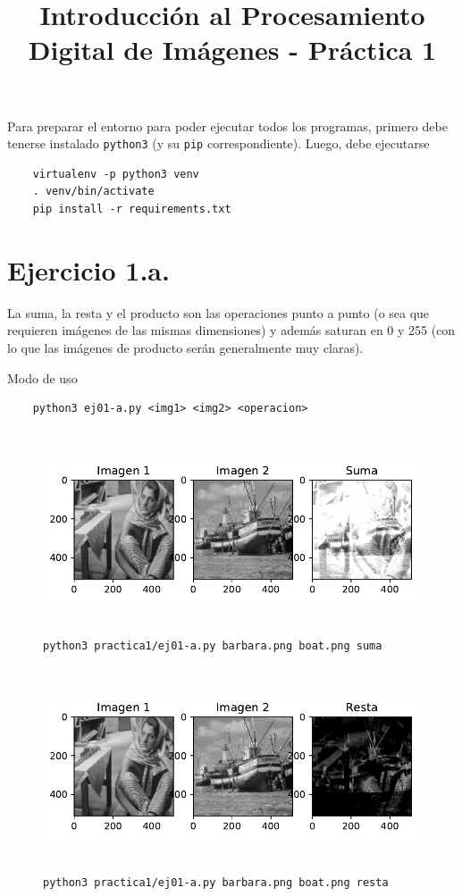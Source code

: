 \documentclass[11pt, spanish]{article}
\title{Introducción al Procesamiento Digital de Imágenes - Práctica 1}
\date{}
\begin{document}
\maketitle

Para preparar el entorno para poder ejecutar todos los programas,
primero debe tenerse instalado \texttt{python3} (y su \texttt{pip} correspondiente).
Luego, debe ejecutarse 
\begin{verbatim}
    virtualenv -p python3 venv 
    . venv/bin/activate
    pip install -r requirements.txt 
\end{verbatim}



\section{Ejercicio 1.a.}

La suma, la resta y el producto son las operaciones punto a punto
(o sea que requieren imágenes de las mismas dimensiones) y además saturan en 0 y 255
(con lo que las imágenes de producto serán generalmente muy claras).

Modo de uso
\begin{verbatim}
    python3 ej01-a.py <img1> <img2> <operacion>
\end{verbatim}


\begin{figure}[H]
\centering
  \includegraphics[height=6cm]{informe-imgs/ej01-a-suma.pdf}
  \caption{\texttt{python3 practica1/ej01-a.py barbara.png boat.png suma}}
\end{figure}

\begin{figure}[H]
\centering
  \includegraphics[height=6cm]{informe-imgs/ej01-a-resta.pdf}
  \caption{\texttt{python3 practica1/ej01-a.py barbara.png boat.png resta}}
\end{figure}
\end{document}
